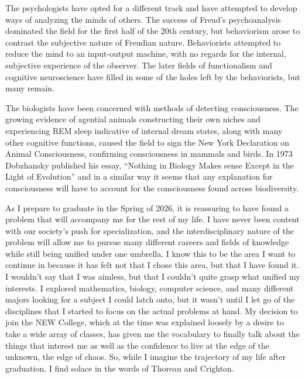 \documentclass[12pt, AofM.tex]{subfiles}
\begin{document}
The psychologists have opted for a different track and have attempted to develop ways of analyzing the minds of others. The success of Freud's psychoanalysis dominated the field for the first half of the 20th century, but behaviorism arose to contrast the subjective nature of Freudian nature. Behaviorists attempted to reduce the mind to an input-output machine, with no regards for the internal, subjective experience of the observer. The later fields of functionalism and cognitive neuroscience have filled in some of the holes left by the behaviorists, but many remain.

The biologists have been concerned with methods of detecting consciousness. The growing evidence of agential animals constructing their own niches and experiencing REM sleep indicative of internal dream states, along with many other cognitive functions, caused the field to sign the New York Declaration on Animal Consciousness, confirming consciousness in mammals and birds. In 1973 Dobzhansky published his essay, “Nothing in Biology Makes sense Except in the Light of Evolution” and in a similar way it seems that any explanation for consciousness will have to account for the consciousness found across biodiversity.

As I prepare to graduate in the Spring of 2026, it is reassuring to have found a problem that will accompany me for the rest of my life. I have never been content with our society's push for specialization, and the interdisciplinary nature of the problem will allow me to pursue many different careers and fields of knowledge while still being unified under one umbrella. I know this to be the area I want to continue in because it has felt not that I chose this area, but that I have found it. I wouldn't say that I was aimless, but that I couldn't quite grasp what unified my interests. I explored mathematics, biology, computer science, and many different majors looking for a subject I could latch onto, but it wasn't until I let go of the disciplines that I started to focus on the actual problems at hand. My decision to join the NEW College, which at the time was explained loosely by a desire to take a wide array of classes, has given me the vocabulary to finally talk about the things that interest me as well as the confidence to live at the edge of the unknown, the edge of chaos. So, while I imagine the trajectory of my life after graduation, I find solace in the words of Thoreau and Crighton.
 
\end{document}
